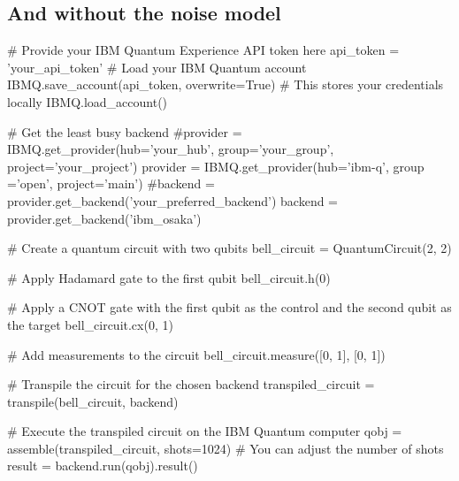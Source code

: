 \documentclass[%
oneside,                 %
final,                   %
10pt]{article}
\begin{document}
\epycod


\subsection{And without the noise model}











































\bpycod
# Provide your IBM Quantum Experience API token here
api_token = 'your_api_token'
# Load your IBM Quantum account
IBMQ.save_account(api_token, overwrite=True)  # This stores your credentials locally
IBMQ.load_account()

# Get the least busy backend
#provider = IBMQ.get_provider(hub='your_hub', group='your_group', project='your_project')
provider = IBMQ.get_provider(hub='ibm-q', group ='open', project='main')
#backend = provider.get_backend('your_preferred_backend')
backend = provider.get_backend('ibm_osaka')

# Create a quantum circuit with two qubits
bell_circuit = QuantumCircuit(2, 2)

# Apply Hadamard gate to the first qubit
bell_circuit.h(0)

# Apply a CNOT gate with the first qubit as the control and the second qubit as the target
bell_circuit.cx(0, 1)

# Add measurements to the circuit
bell_circuit.measure([0, 1], [0, 1])

# Transpile the circuit for the chosen backend
transpiled_circuit = transpile(bell_circuit, backend)

# Execute the transpiled circuit on the IBM Quantum computer
qobj = assemble(transpiled_circuit, shots=1024)  # You can adjust the number of shots
result = backend.run(qobj).result()
\end{document}
